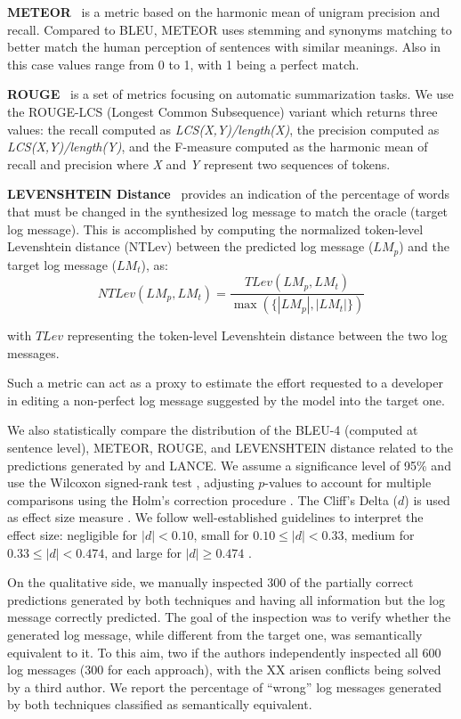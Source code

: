 \textbf{METEOR}~\cite{meteor} is a metric based on the harmonic mean of unigram precision and recall. Compared to BLEU, METEOR uses stemming and synonyms matching to better match the human perception of sentences with similar meanings. Also in this case values range from 0 to 1, with 1 being a perfect match.

\textbf{ROUGE}~\cite{lin2004rouge} is a set of metrics focusing on automatic summarization tasks. We use the ROUGE-LCS (Longest Common Subsequence) variant which returns three values: the recall computed as \textit{LCS(X,Y)/length(X)}, the precision computed as \textit{LCS(X,Y)/length(Y)}, and the F-measure computed as the harmonic mean of recall and precision where \textit{X} and \textit{Y} represent two sequences of tokens.

\textbf{LEVENSHTEIN Distance}~\cite{levenshtein1966} provides an indication of the percentage of words that must be changed in the synthesized log message to match the oracle (\ie target log message).  This is accomplished by computing the normalized token-level Levenshtein distance \cite{levenshtein1966} (NTLev) between the predicted log message ($LM_p$) and the target log message ($LM_t$), as:
$$
NTLev(LM_p, LM_t) = \frac{\mathit{TLev}(LM_p, LM_t)}{\max({\{}|LM_p|, |LM_t|\})}
$$

\noindent with $\mathit{TLev}$ representing the token-level Levenshtein distance between the two log messages. 

Such a metric can act as a proxy to estimate the effort requested to a developer in editing a non-perfect log message suggested by the model into the target one.

We also statistically compare the distribution of the BLEU-4 (computed at sentence level), METEOR, ROUGE, and LEVENSHTEIN distance related to the predictions generated by \approach and LANCE. We assume a significance level of 95\% and use the Wilcoxon signed-rank test \cite{wilcoxon}, adjusting $p$-values to account for multiple comparisons using the Holm's correction procedure \cite{Holm1979a}. The  Cliff's Delta ($d$) is used as effect size measure \cite{Gris2005a}. We follow well-established guidelines to interpret the effect size: negligible for $|d| < 0.10$, small for $0.10 \le |d| < 0.33$, medium for $0.33 \le |d| < 0.474$, and large for $|d| \ge 0.474$ \cite{Gris2005a}.

On the qualitative side, we manually inspected 300 of the partially correct predictions generated by both techniques and having all information but the log message correctly predicted. The goal of the inspection was to verify whether the generated log message, while different from the target one, was semantically equivalent to it. To this aim, two if the authors independently inspected all 600 log messages (300 for each approach), with the XX arisen conflicts being solved by a third author. We report the percentage of ``wrong'' log messages generated by both techniques classified as semantically equivalent.

